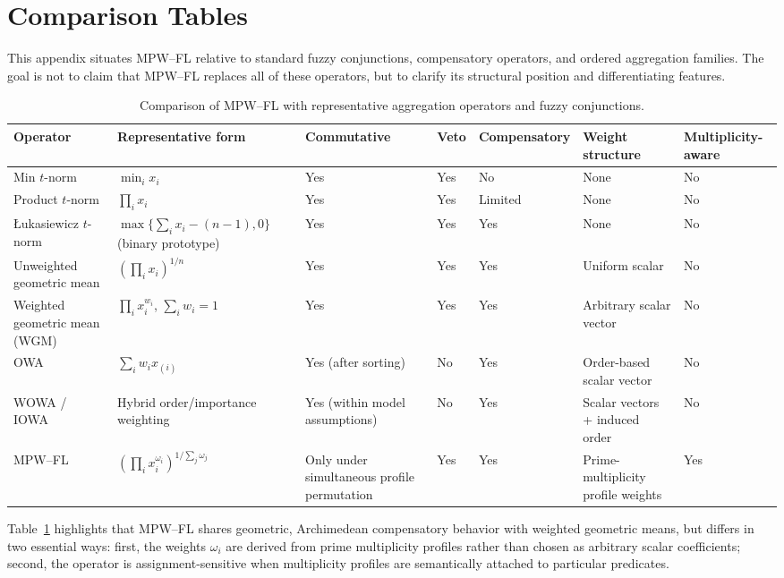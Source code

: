 \documentclass[11pt]{article}
\begin{document}
\appendix

\section{Comparison Tables}
\label{app:comparison}

This appendix situates MPW--FL relative to standard fuzzy conjunctions, compensatory operators, and ordered aggregation families. The goal is not to claim that MPW--FL replaces all of these operators, but to clarify its structural position and differentiating features.

\begin{table}[ht]
\centering
\caption{Comparison of MPW--FL with representative aggregation operators and fuzzy conjunctions.}
\label{tab:comparison-main}
\begin{tabular}{p{2.6cm}p{2.7cm}p{1.8cm}p{1.6cm}p{1.8cm}p{2.2cm}p{2.6cm}}
\hline
\textbf{Operator} & \textbf{Representative form} & \textbf{Commutative} & \textbf{Veto} & \textbf{Compensatory} & \textbf{Weight structure} & \textbf{Multiplicity-aware} \\
\hline
Min $t$-norm &
$\min_i x_i$ &
Yes &
Yes &
No &
None &
No \\
Product $t$-norm &
$\prod_i x_i$ &
Yes &
Yes &
Limited &
None &
No \\
\L{}ukasiewicz $t$-norm &
$\max\{\sum_i x_i-(n-1),0\}$ (binary prototype) &
Yes &
Yes &
Yes &
None &
No \\
Unweighted geometric mean &
$\left(\prod_i x_i\right)^{1/n}$ &
Yes &
Yes &
Yes &
Uniform scalar &
No \\
Weighted geometric mean (WGM) &
$\prod_i x_i^{w_i}$, $\sum_i w_i = 1$ &
Yes &
Yes &
Yes &
Arbitrary scalar vector &
No \\
OWA &
$\sum_i w_i x_{(i)}$ &
Yes (after sorting) &
No &
Yes &
Order-based scalar vector &
No \\
WOWA / IOWA &
Hybrid order/importance weighting &
Yes (within model assumptions) &
No &
Yes &
Scalar vectors + induced order &
No \\
MPW--FL &
$\left(\prod_i x_i^{\omega_i}\right)^{1/\sum_j \omega_j}$ &
Only under simultaneous profile permutation &
Yes &
Yes &
Prime-multiplicity profile weights &
Yes \\
\hline
\end{tabular}
\end{table}

Table~\ref{tab:comparison-main} highlights that MPW--FL shares geometric, Archimedean compensatory behavior with weighted geometric means, but differs in two essential ways: first, the weights $\omega_i$ are derived from prime multiplicity profiles rather than chosen as arbitrary scalar coefficients; second, the operator is assignment-sensitive when multiplicity profiles are semantically attached to particular predicates.
\end{document}
